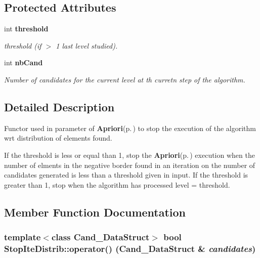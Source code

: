 \subsection*{Protected Attributes}
\begin{CompactItemize}
\item 
int {\bf threshold}\label{class_stop_ite_distrib_c26278c24bbfe949fb0010be2b32b170}

\begin{CompactList}\small\item\em threshold (if $>$ 1 last level studied). \item\end{CompactList}\item 
int {\bf nb\-Cand}\label{class_stop_ite_distrib_0c03770bf116aab0df9410be57e94e61}

\begin{CompactList}\small\item\em Number of candidates for the current level at th curretn step of the algorithm. \item\end{CompactList}\end{CompactItemize}


\subsection{Detailed Description}
Functor used in parameter of {\bf Apriori}{\rm (p.\,\pageref{class_apriori})} to stop the execution of the algorithm wrt distribution of elements found. 

If the threshold is less or equal than 1, stop the {\bf Apriori}{\rm (p.\,\pageref{class_apriori})} execution when the number of elments in the negative border found in an iteration on the number of candidates generated is less than a threshold given in input. If the threshold is greater than 1, stop when the algorithm has processed level = threshold. 



\subsection{Member Function Documentation}
\subsubsection{\setlength{\rightskip}{0pt plus 5cm}template$<$class Cand\_\-Data\-Struct$>$ bool Stop\-Ite\-Distrib::operator() (Cand\_\-Data\-Struct \& {\em candidates})\hspace{0.3cm}{\tt  [inline]}}\label{class_stop_ite_distrib_d6386032f32f664ed1b4813b3a645b62}


